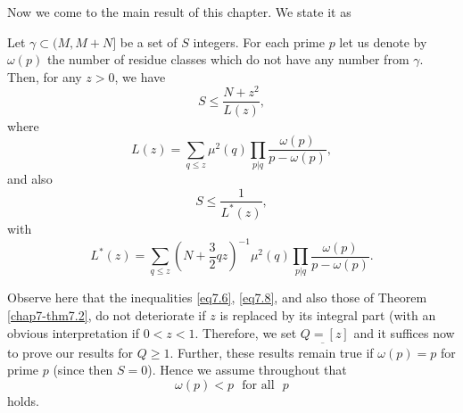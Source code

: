 Now we come to the main result of this chapter. We state it as

\setcounter{section}{7}
\setcounter{theorem}{0}
\begin{theorem}\label{chap7-thm7.1}%
Let $ \gamma \subset (M, M+N]$ be a set of $S$ integers. For each
  prime $p$ let us denote by $\omega(p)$ the number of residue classes
  which do not have any number from $\gamma$. Then, for any $z > 0$, we
  have 
\begin{equation}
S \leq \frac{N+z^2}{L(z)}, \tag{7.6}\label{eq7.6}
\end{equation}
where
\begin{equation}
L(z)=\sum_{q \leq z} \mu^2 (q) \prod_{p|q}
\frac{\omega(p)}{p-\omega(p)}, \tag{7.7}\label{eq7.7} 
\end{equation}
and also
\begin{equation}
S \leq \frac{1}{L^*(z)}, \tag{7.8}\label{eq7.8}
\end{equation}
with
\begin{equation}
L^* (z) = \sum_{q \leq z}(N + \frac{3}{2}qz)^{-1} \mu^2
(q)\prod_{p|q}\frac{\omega (p)}{p-\omega(p)}. \tag{7.9}\label{eq7.9} 
\end{equation}
\end{theorem}

\begin{remarks*}
Observe here that the inequalities \eqref{eq7.6}, \eqref{eq7.8}, and
also those of 
Theorem \ref{chap7-thm7.2}, do not deteriorate if $z$ is replaced by
its integral 
part (with an obvious interpretation if $0 < z < 1$. Therefore, we
set $\underbar{Q=[z]}$ and it suffices now to prove our results for
$Q \geq 1$. Further, these results remain true if $\omega(p) =p$ for
prime $p$ (since then $S = 0$). Hence we assume throughout
that\pageoriginale  
\begin{equation}
\omega (p) < p \text{~ for all~ } p \tag{7.10}\label{eq7.10} 
\end{equation}
holds.
\end{remarks*}

